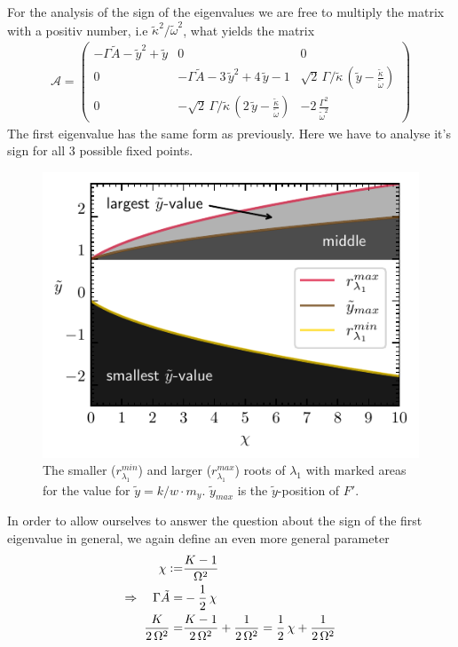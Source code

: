 \documentclass{article}
\begin{document}
For the analysis of the sign of the eigenvalues we are free to multiply the matrix with a positiv number, i.e $\tilde{\kappa}^2/\tilde{\omega}^2$, what yields the matrix
\begin{align*}
    \mathcal{A}=\left( \begin{array}{ccc}
        -\Gamma\tilde{A}-\tilde{y}^2+\tilde{y}&  0 & 0\\
        0 & -\Gamma\tilde{A}-3\,\tilde{y}^2+4\,\tilde{y}-1 & \sqrt{2}\,\Gamma/\tilde{\kappa}\,(\tilde{y}-\frac{\tilde{\kappa}}{\tilde{\omega}})\\
        0 &  -\sqrt{2}\,\Gamma/\tilde{\kappa}\,(2\,\tilde{y}-\frac{\tilde{\kappa}}{\tilde{\omega}}) & -2\,\frac{\Gamma^2}{\tilde{\omega}^2}
    \end{array} \right)
\end{align*}
The first eigenvalue has the same form as previously. Here we have to analyse it's sign for all 3 possible fixed points.\newpage
\begin{figure}
    \includegraphics{pictures/sign_of_ev1.pdf}
    \vspace*{-2cm}\caption{The smaller ($r_{\lambda_1}^{min}$) and larger ($r_{\lambda_1}^{max}$) roots of $\lambda_1$ with marked areas for the value for $\tilde{y}=k/w\cdot m_y$. $\tilde{y}_{max}$ is the $\tilde{y}$-position of $F'$.}
    \label{fig:sign_lam1}
\end{figure}
In order to allow ourselves to answer the question about the sign of the first eigenvalue in general, we again define an even more general parameter
\begin{align*}
    \chi\vcentcolon=&\frac{K-1}{\Omega^2}\\
    \Rightarrow\quad\Gamma\tilde{A}=&-\frac{1}{2}\,\chi\\
    \frac{K}{2\,\Omega^2}=&\frac{K-1}{2\,\Omega^2}+\frac{1}{2\,\Omega^2}=\frac{1}{2}\,\chi+\frac{1}{2\,\Omega^2}
\end{align*}
\end{document}
